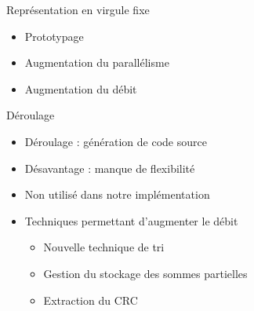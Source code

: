 \documentclass[t,compress,mathserif,12pt,xcolor=dvipsnames]{beamer}
\begin{document}
\begin{frame}[c]{Représentation en virgule fixe}
  \begin{table}[hb]
    \renewcommand{\arraystretch}{1.1}
    \centering
    {\small{}}
   \end{table}
    \begin{itemize}
    	\item Prototypage
    	\item Augmentation du parallélisme
    	\item Augmentation du débit
    \end{itemize}
\end{frame}


\begin{frame}[c]{Déroulage}
\begin{itemize}
	\item Déroulage : génération de code source
	\item Désavantage : manque de flexibilité
	\item Non utilisé dans notre implémentation
	\item Techniques permettant d'augmenter le débit
	\begin{itemize}
		\item Nouvelle technique de tri
		\item Gestion du stockage des sommes partielles
		\item Extraction du CRC
	\end{itemize}
\end{itemize}
\end{frame}
\end{document}
